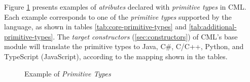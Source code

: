 \begin{examples}
Figure \ref{fig:ex:primitive-types} presents examples
of \emph{atributes} declared with \emph{primitive types} in CML.
Each example corresponds to one of the \emph{primitive types} 
supported by the language,
as shown in tables \ref{tab:core-primitive-types} and \ref{tab:additional-primitive-types}.
The \emph{target constructors} (\ref{sec:constructors})
of CML's base module will translate the primitive types to Java, C\#, C/C++,
Python, and TypeScript (JavaScript),
according to the mapping shown in the tables.

\end{examples}

\begin{figure}
\verbatimfont{\small}

\caption{Example of \emph{Primitive Types}}
\label{fig:ex:primitive-types}
\end{figure}
